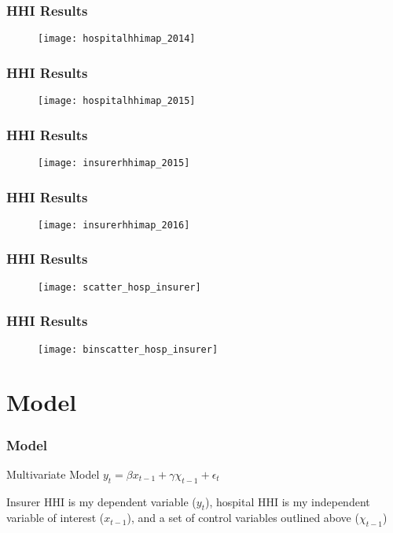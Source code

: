 \documentclass{beamer}
\begin{document}
\begin{frame}
\frametitle{HHI Results}
\begin{figure}
\texttt{[image: hospitalhhimap\_2014]}
\end{figure}
\end{frame}
\begin{frame}
\frametitle{HHI Results}
\begin{figure}
\texttt{[image: hospitalhhimap\_2015]}
\end{figure}
\end{frame}
\begin{frame}
\frametitle{HHI Results}
\begin{figure}
\texttt{[image: insurerhhimap\_2015]}
\end{figure}
\end{frame}
\begin{frame}
\frametitle{HHI Results}
\begin{figure}
\texttt{[image: insurerhhimap\_2016]}
\end{figure}
\end{frame}
\begin{frame}
\frametitle{HHI Results}
\begin{figure}
\texttt{[image: scatter\_hosp\_insurer]}
\end{figure}
\end{frame}
\begin{frame}
\frametitle{HHI Results}
\begin{figure}
\texttt{[image: binscatter\_hosp\_insurer]}
\end{figure}
\end{frame}

\section[Model]{Model}

\begin{frame}
\frametitle{Model}
\begin{block}{Multivariate Model}
$y_t=\beta x_{t-1}+\gamma \chi_{t-1}+\epsilon_{t}$
\end{block}
Insurer HHI is my dependent variable ($y_t$), hospital HHI is my independent variable of interest ($x_{t-1}$), and a set of control variables outlined above ($\chi_{t-1}$)
\end{frame}
\end{document}
